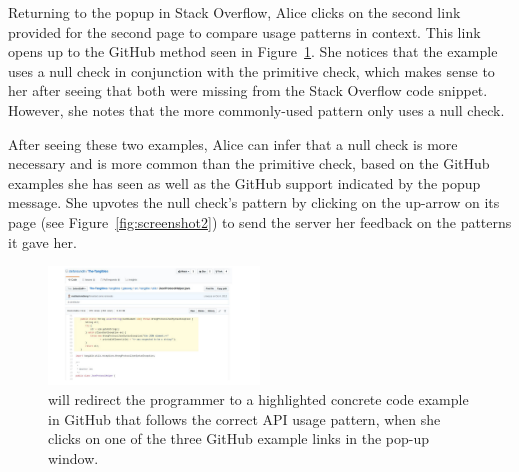 Returning to the popup in Stack Overflow, Alice clicks on the second link provided for the second page to compare usage patterns in context. This link opens up to the GitHub method seen in Figure~\ref{fig:github}. She notices that the example uses a null check in conjunction with the primitive check, which makes sense to her after seeing that both were missing from the Stack Overflow code snippet. However, she notes that the more commonly-used pattern only uses a null check.

After seeing these two examples, Alice can infer that a null check is more necessary and is more common than the primitive check, based on the GitHub examples she has seen as well as the GitHub support indicated by the popup message. She upvotes the null check's pattern by clicking on the up-arrow on its page (see Figure~\ref{fig:screenshot2}) to send the server her feedback on the patterns it gave her.

\begin{figure}
\centering
\includegraphics[width=0.5\textwidth]{github-example.pdf}
  \vspace{.1in}
  \caption{{\tool} will redirect the programmer to a highlighted concrete code example in GitHub that follows the correct API usage pattern, when she clicks on one of the three GitHub example links in the pop-up window.\protect\footnotemark}
  \label{fig:github}
\end{figure}



